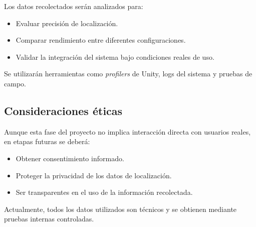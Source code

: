 \documentclass{article}
\begin{document}
Los datos recolectados serán analizados para:

\begin{itemize}
    \item Evaluar precisión de localización.
    \item Comparar rendimiento entre diferentes configuraciones.
    \item Validar la integración del sistema bajo condiciones reales de uso.
\end{itemize}

Se utilizarán herramientas como \textit{profilers} de Unity, logs del sistema y pruebas de campo.

\subsection{Consideraciones éticas}

Aunque esta fase del proyecto no implica interacción directa con usuarios reales, en etapas futuras se deberá:

\begin{itemize}
    \item Obtener consentimiento informado.
    \item Proteger la privacidad de los datos de localización.
    \item Ser transparentes en el uso de la información recolectada.
\end{itemize}

Actualmente, todos los datos utilizados son técnicos y se obtienen mediante pruebas internas controladas.

\newpage
\end{document}
